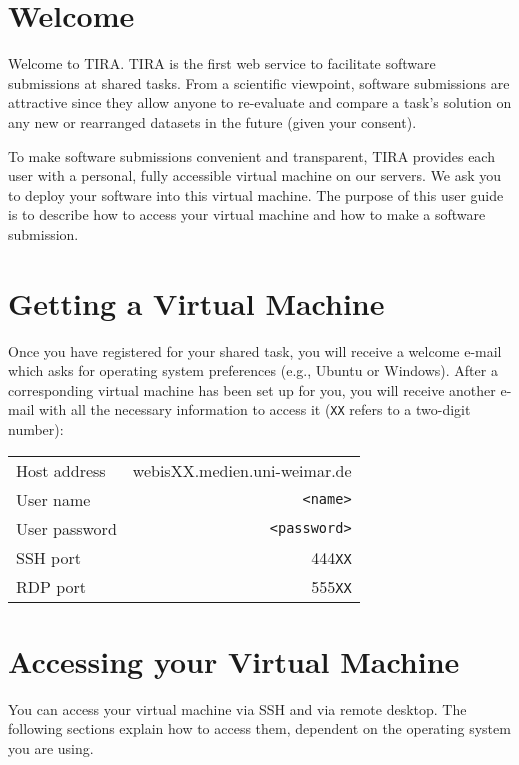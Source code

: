 \section{Welcome}

Welcome to TIRA. TIRA is the first web service to facilitate software submissions at shared tasks. From a scientific viewpoint, software submissions are attractive since they allow anyone to re-evaluate and compare a task's solution on any new or rearranged datasets in the future (given your consent).

To make software submissions convenient and transparent, TIRA provides each user with a personal, fully accessible virtual machine on our servers. We ask you to deploy your software into this virtual machine. The purpose of this user guide is to describe how to access your virtual machine and how to make a software submission.


\section{Getting a Virtual Machine}

Once you have registered for your shared task, you will receive a welcome e-mail which asks for operating system preferences (e.g., Ubuntu or Windows). After a corresponding virtual machine has been set up for you, you will receive another e-mail with all the necessary information to access it (\texttt{XX} refers to a two-digit number):\\
\begin{center}
\begin{tabular}{@{}lr@{}}
\toprule
Host address & webisXX.medien.uni-weimar.de \\  
User name& \texttt{<name>} \\  
User password & \texttt{<password>} \\  
SSH port & 444\texttt{XX} \\
RDP port & 555\texttt{XX} \\ 
\bottomrule
\end{tabular}
\end{center}

\section{Accessing your Virtual Machine}

You can access your virtual machine via SSH and via remote desktop. The following sections explain how to access them, dependent on the operating system you are using.

